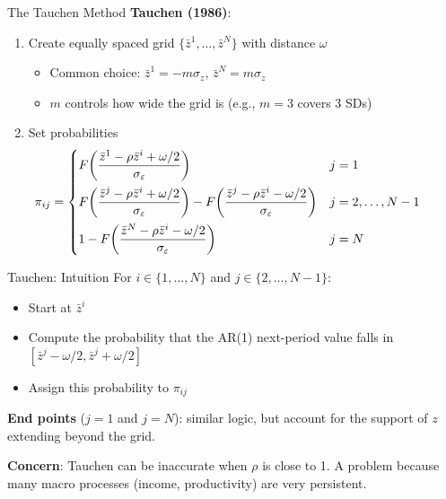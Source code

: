 \documentclass[blue]{beamer}
\begin{document}
\begin{frame}{The Tauchen Method}
	\textbf{Tauchen (1986)}:
	\begin{enumerate}
		\item Create equally spaced grid $\{\bar{z}^1, \ldots, \bar{z}^N\}$ with distance $\omega$
		\begin{itemize}
			\item Common choice: $\bar{z}^1 = -m \sigma_z$, $\bar{z}^N = m \sigma_z$
			\item $m$ controls how wide the grid is (e.g., $m = 3$ covers 3 SDs)
		\end{itemize}
		\item Set probabilities
	\[
	\hspace{-25pt}\pi_{ij} = \begin{cases}
		F\!\left(\dfrac{\bar{z}^1 - \rho \bar{z}^i + \omega/2}{\sigma_\varepsilon}\right) & j = 1 \\[10pt]
		F\!\left(\dfrac{\bar{z}^j - \rho \bar{z}^i + \omega/2}{\sigma_\varepsilon}\right) - F\!\left(\dfrac{\bar{z}^j - \rho \bar{z}^i - \omega/2}{\sigma_\varepsilon}\right) & j = 2, \ldots, N-1 \\[10pt]
		1 - F\!\left(\dfrac{\bar{z}^N - \rho \bar{z}^i - \omega/2}{\sigma_\varepsilon}\right) & j = N
	\end{cases}
	\]
		\end{enumerate}
\end{frame}

\begin{frame}{Tauchen: Intuition}
	For $i \in \{1, \ldots, N\}$ and $j \in \{2, \ldots, N-1\}$:
	\begin{itemize}
		\item Start at $\bar{z}^i$
		\item Compute the probability that the AR(1) next-period value falls in $[\bar{z}^j - \omega/2, \bar{z}^j + \omega/2]$
		\item Assign this probability to $\pi_{ij}$
	\end{itemize}
	
	\bigskip
	\textbf{End points} ($j = 1$ and $j = N$): similar logic, but account for the support of $z$ extending beyond the grid.
	
	\bigskip
	\textbf{Concern}: Tauchen can be inaccurate when $\rho$ is close to 1. A problem because many macro processes (income, productivity) are very persistent.
\end{frame}
\end{document}
